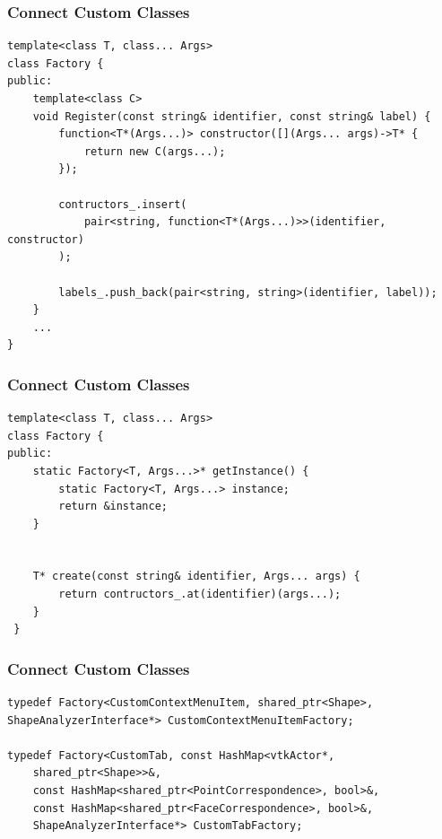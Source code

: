 \documentclass[compress]{beamer}
\begin{document}
\begin{frame}[fragile]
\frametitle{Connect Custom Classes}

\begin{lstlisting}
template<class T, class... Args>
class Factory {
public:
    template<class C>
    void Register(const string& identifier, const string& label) {
        function<T*(Args...)> constructor([](Args... args)->T* {
            return new C(args...);
        });

        contructors_.insert(
            pair<string, function<T*(Args...)>>(identifier, constructor)
        );

        labels_.push_back(pair<string, string>(identifier, label));
    }
    ...
}
\end{lstlisting}

\end{frame}

\begin{frame}[fragile]
\frametitle{Connect Custom Classes}

\begin{lstlisting}
template<class T, class... Args>
class Factory {
public:
    static Factory<T, Args...>* getInstance() {
        static Factory<T, Args...> instance;
        return &instance;
    }


    T* create(const string& identifier, Args... args) {
        return contructors_.at(identifier)(args...);
    }
 }
\end{lstlisting}
  
\end{frame}

\begin{frame}[fragile]
\frametitle{Connect Custom Classes}

\begin{lstlisting}
typedef Factory<CustomContextMenuItem, shared_ptr<Shape>, ShapeAnalyzerInterface*> CustomContextMenuItemFactory;

typedef Factory<CustomTab, const HashMap<vtkActor*, 
    shared_ptr<Shape>>&, 
    const HashMap<shared_ptr<PointCorrespondence>, bool>&, 
    const HashMap<shared_ptr<FaceCorrespondence>, bool>&, 
    ShapeAnalyzerInterface*> CustomTabFactory;
\end{lstlisting}
  
\end{frame}
\end{document}
